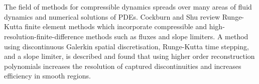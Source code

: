 	\\ \\
	The field of methods for compressible dynamics spreads over many areas of fluid dynamics and numerical solutions of PDEs.  Cockburn and Shu \cite{Cockburn01} review Runge-Kutta finite element methods which incorporate compressible and high-resolution-finite-difference methods such as fluxes and slope limiters. A method using discontinuous Galerkin spatial discretisation, Runge-Kutta time stepping, and a slope limiter, is described and found that using higher order reconstruction polynomials increases the resolution of captured discontinuities and increases efficiency in smooth regions. 